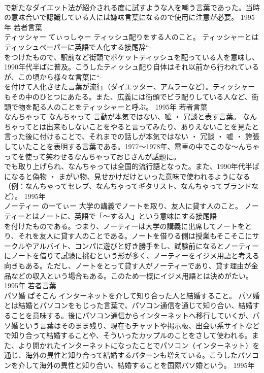 \documentclass[8pt]{extreport}
\begin{document}
\begin{CJK}{UTF8}{min}
\\	で新たなダイエット法が紹介される度に試すような人を嘲う言葉であった。当時の意味合いで認識している人には嫌味言葉になるので使用に注意が必要。	1995年	若者言葉	
\\	ティッシャー	てぃっしゃー	ティッシュ配りをする人のこと。	ティッシャーとはティッシュペーパーに英語で人化する接尾辞“-
\\	をつけたもので、駅前など街頭でポケットティッシュを配っている人を意味し、1990年代半ばに普及。こうしたティッシュ配り自体はそれ以前から行われているが、この頃から様々な言葉に“-
\\	を付けて人化させた言葉が流行（ダイエッター、アムラーなど）。ティッシャーもその中のひとつにあたる。また、広義には街頭でビラ配りしている人など、街頭で物を配る人のことをティッシャーと呼ぶ。	1995年	若者言葉	
\\	なんちゃって	なんちゃって	言動が本気ではない、嘘 ・ 冗談と表す言葉。	なんちゃってとは出来もしないことをやると言ってみたり、ありえないことを見たと言った後に付けることで、それまでの話しが本気ではない ・ 冗談 ・ 嘘 ・ 誇張していたことを表明する言葉である。1977～1978年、電車の中でこのな～んちゃってを使って笑わせるなんちゃっておじさんが話題に。
\\	でも取り上げられ、なんちゃっては全国的流行語となった。また、1990年代半ばになると偽物 ・ まがい物、見せかけだけといった意味で使われるようになる（例：なんちゃってセレブ、なんちゃってギタリスト、なんちゃってブランドなど）。	1995年	
\\	ノーティー	のーてぃー	大学の講義でノートを取り、友人に貸す人のこと。	ノーティーとはノートに、英語で「～する人」という意味にする接尾語
\\	を付けたものである。つまり、ノーティーは大学の講義に出席してノートをとり、それを友人に貸す人のことである。ノートを借りる側は授業もそこそこにサークルやアルバイト、コンパに遊びと好き勝手をし、試験前になるとノーティーにノートを借りて試験に挑むという形が多く、ノーティーをイジメ用語と考える向きもある。ただし、ノートをとって貸す人がノーティーであり、貸す理由が金品などの収入という場合もある。このため一概にイジメ用語とは決めがたい。	1995年	若者言葉	
\\	パソ婚	ぱそこん	インターネットを介して知り合った人と結婚すること。	パソ婚とは結婚とパソコンをもじった言葉で、パソコン通信を通じて知り合い、結婚することを意味する。後にパソコン通信からインターネットへ移行していくが、パソ婚という言葉はそのまま残り、現在もチャットや掲示板、出会い系サイトなどで知り合って結婚することや、そういったカップルのことをさして使われる。また、より開かれたインターネットになったことでパソコン（インターネット）を通じ、海外の異性と知り合って結婚するパターンも増えている。こうしたパソコンを介して海外の異性と知り合い、結婚することを国際パソ婚という。	1995年	

\end{CJK}
\end{document}
